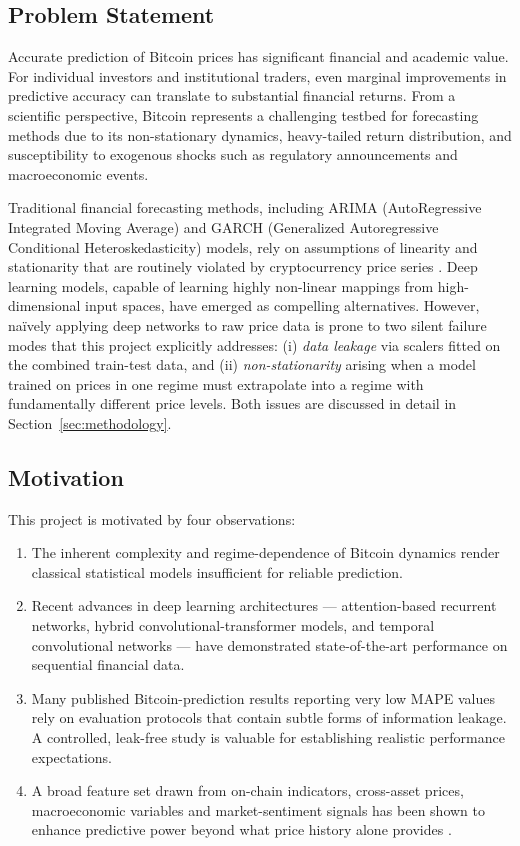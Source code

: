\documentclass[12pt]{article}
\begin{document}
\subsection{Problem Statement}

Accurate prediction of Bitcoin prices has significant financial and academic value. For individual investors and institutional traders, even marginal improvements in predictive accuracy can translate to substantial financial returns. From a scientific perspective, Bitcoin represents a challenging testbed for forecasting methods due to its non-stationary dynamics, heavy-tailed return distribution, and susceptibility to exogenous shocks such as regulatory announcements and macroeconomic events.

Traditional financial forecasting methods, including ARIMA (AutoRegressive Integrated Moving Average) and GARCH (Generalized Autoregressive Conditional Heteroskedasticity) models, rely on assumptions of linearity and stationarity that are routinely violated by cryptocurrency price series \cite{jin2025tcn}. Deep learning models, capable of learning highly non-linear mappings from high-dimensional input spaces, have emerged as compelling alternatives. However, na\"{i}vely applying deep networks to raw price data is prone to two silent failure modes that this project explicitly addresses: (i) \textit{data leakage} via scalers fitted on the combined train-test data, and (ii) \textit{non-stationarity} arising when a model trained on prices in one regime must extrapolate into a regime with fundamentally different price levels. Both issues are discussed in detail in Section~\ref{sec:methodology}.

\subsection{Motivation}

This project is motivated by four observations:
\begin{enumerate}[leftmargin=*]
    \item The inherent complexity and regime-dependence of Bitcoin dynamics render classical statistical models insufficient for reliable prediction.
    \item Recent advances in deep learning architectures --- attention-based recurrent networks, hybrid convolutional-transformer models, and temporal convolutional networks --- have demonstrated state-of-the-art performance on sequential financial data.
    \item Many published Bitcoin-prediction results reporting very low MAPE values rely on evaluation protocols that contain subtle forms of information leakage. A controlled, leak-free study is valuable for establishing realistic performance expectations.
    \item A broad feature set drawn from on-chain indicators, cross-asset prices, macroeconomic variables and market-sentiment signals has been shown to enhance predictive power beyond what price history alone provides \cite{wu2025cfa,jin2025tcn}.
\end{enumerate}
\end{document}
